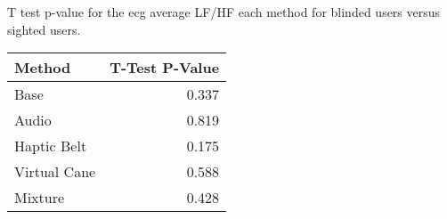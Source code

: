 
\centering
\caption{T test p-value for the ecg average LF/HF each method for blinded users versus sighted users.}
\label{tab:ttest_ecg_lfhf}
\begin{tabular}{lr}
\toprule
      Method &  T-Test P-Value \\
\midrule
        Base &           0.337 \\
       Audio &           0.819 \\
 Haptic Belt &           0.175 \\
Virtual Cane &           0.588 \\
     Mixture &           0.428 \\
\bottomrule
\end{tabular}
